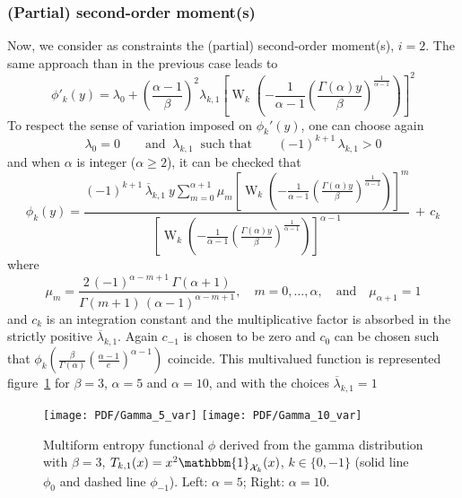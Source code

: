 \documentclass[english,onecolumn]{elsarticle}
\def\X{\mathcal{X}}
\def\un{\mathbbm{1}}
\def\W{\operatorname{W}}
\begin{document}

\subsubsection{(Partial) second-order moment(s)}

Now, we consider as constraints the (partial) second-order moment(s), $i = 2$.
%
The same approach than in the previous case leads to
%
\[
\phi'_k(y) = \lambda_0 + \left(\frac{\alpha-1}{\beta}\right)^2 \lambda_{k,1}
\left[ \W_k \left( - \frac{1}{\alpha-1} \left( \frac{\Gamma(\alpha) y}{\beta}
\right)^{\frac{1}{\alpha-1}} \right) \right]^2
\]
%
To respect the sense of variation imposed on $\phi_k'(y)$, one can choose again
%
\[
\lambda_0 = 0 \qquad \mbox{and } \: \lambda_{k,1} \: \mbox{ such that} \qquad
(-1)^{k+1} \, \lambda_{k,1} > 0
\]
%
and when $\alpha$ is integer ($\alpha \ge 2$), it can be checked that
%
\[
\phi_k(y) = \frac{\displaystyle (-1)^{k+1} \, \overline{\lambda}_{k,1} \: y
\sum_{m=0}^{\alpha+1} \mu_m \left[\W_k\left(- \frac{1}{\alpha-1} \left(
\frac{\Gamma(\alpha) y}{\beta} \right)^{\frac{1}{\alpha-1}} \right)
\right]^m}{\left[\W_k\left(- \frac{1}{\alpha-1} \left( \frac{\Gamma(\alpha)
y}{\beta} \right)^{\frac{1}{\alpha-1}} \right) \right]^{\alpha-1}} \, + \, c_k
\]
%
where
%
\[
\mu_m = \frac{2 \, (-1)^{\alpha-m+1} \, \Gamma(\alpha+1)}{\Gamma(m+1) \,
(\alpha-1)^{\alpha-m+1}}, \quad m = 0, \ldots, \alpha, \quad \mbox{and} \quad
\mu_{\alpha+1} = 1
\]
%
and $c_k$ is  an integration constant and the  multiplicative factor is absorbed
in the strictly positive  $\overline{\lambda}_{k,1}$. Again $c_{-1}$ is chosen to
be    zero    and   $c_0$    can    be    chosen    such   that    $\phi_k\left(
  \frac{\beta}{\Gamma(\alpha)}   \left(   \frac{\alpha-1}{e}  \right)^{\alpha-1}
\right)$    coincide.      This    multivalued    function     is    represented
figure~\ref{fig:Entropy-gamma-var} for $\beta  = 3$, $\alpha = 5$  and $\alpha =
10$, and with the choices $\overline{\lambda}_{k,1} = 1$
%
\begin{figure}[htbp]
\centerline{
\texttt{[image: PDF/Gamma\_5\_var]} \hspace{2mm}
\texttt{[image: PDF/Gamma\_10\_var]}}
%
\caption{Multiform entropy functional $\phi$ derived from the gamma distribution
  with $\beta = 3$, $T_{k,1}(x) = x^2 \un_{\X_k}(x)$, $k \in \{0 , -1 \}$ (solid
  line $\phi_0$ and dashed line $\phi_{-1}$). Left: $\alpha = 5$; Right: $\alpha
  = 10$.}
\label{fig:Entropy-gamma-var}
\end{figure}
\end{document}
